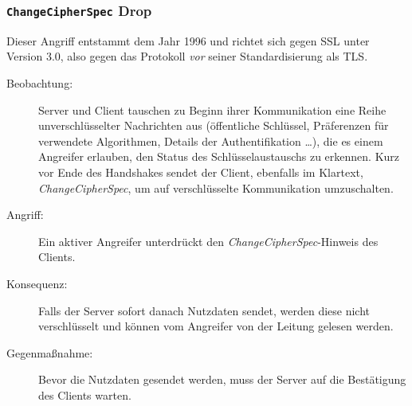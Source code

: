 \subsubsection{\texttt{ChangeCipherSpec} Drop}
Dieser Angriff entstammt dem Jahr 1996 und richtet sich gegen SSL unter Version 3.0, also gegen das Protokoll \emph{vor} seiner Standardisierung als TLS.
\begin{description}
	\item[Beobachtung:] Server und Client tauschen zu Beginn ihrer Kommunikation eine Reihe unverschlüsselter Nachrichten aus (öffentliche Schlüssel,
	Präferenzen für verwendete Algorithmen, Details der Authentifikation \ldots), die es einem Angreifer erlauben, den Status des
	Schlüsselaustauschs zu erkennen. Kurz vor Ende des Handshakes sendet der Client, ebenfalls im Klartext, \emph{ChangeCipherSpec}, um auf
	verschlüsselte Kommunikation umzuschalten.
	\item[Angriff:] Ein aktiver Angreifer unterdrückt den \emph{ChangeCipherSpec}-Hinweis des Clients.
	\item[Konsequenz:] Falls der Server sofort danach Nutzdaten sendet, werden diese nicht verschlüsselt und können vom Angreifer von der Leitung
	gelesen werden.
	\item[Gegenmaßnahme:] Bevor die Nutzdaten gesendet werden, muss der Server auf die Bestätigung des Clients warten.
\end{description}

